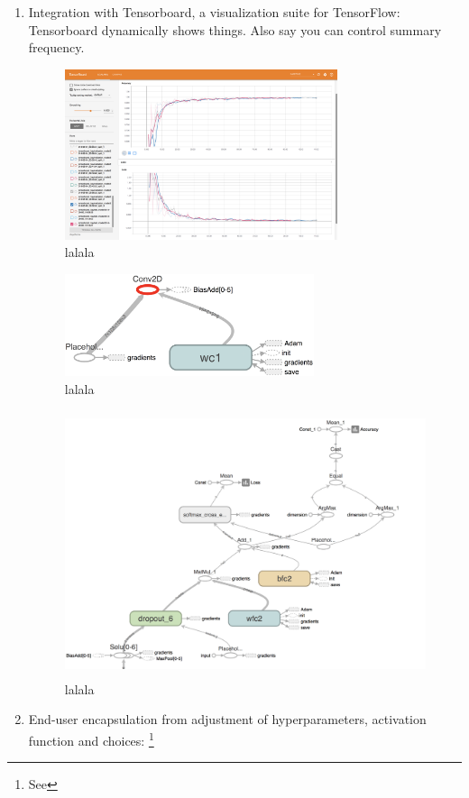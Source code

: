 \documentclass[a4paper, 11pt]{article} %
\begin{document}
	\begin{enumerate}
		\item Integration with Tensorboard, a visualization suite for 
		TensorFlow: Tensorboard dynamically shows things. Also say you can 
		control summary frequency.
		\begin{figure}[H]
			\centering
			\includegraphics[height=5cm]{figures/tb_acc_loss}
			\caption{lalala}
		\end{figure}
		\begin{figure}[H]
			\centering
			\includegraphics[height=3cm]{figures/tb_graph_2}
			\caption{lalala}
		\end{figure}
		\begin{figure}[H]
			\centering
			\includegraphics[height=7.8cm]{figures/tb_graph_1}
			\caption{lalala}
		\end{figure}
		\item End-user encapsulation from adjustment of hyperparameters, 
		activation function and choices: \cite{selu-motivation} \footnote{See 
}
\end{enumerate}
\end{document}
